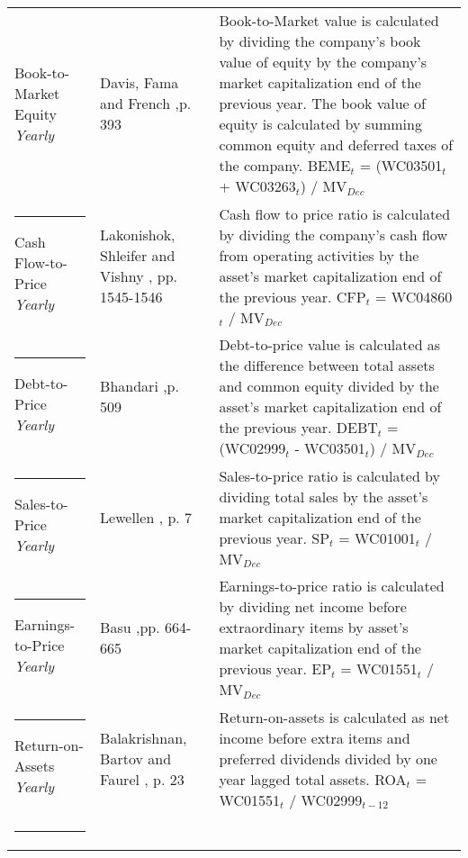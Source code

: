 \documentclass[12pt]{article}
\begin{document}
\begin{appendices}
{{\begin{xltabular}{\textwidth}{ >{\raggedright\arraybackslash}p{0.23\textwidth} >{\raggedright\arraybackslash}p{0.2\textwidth} X}
Book-to-Market Equity \newline \emph{Yearly} 	& Davis, Fama and French \citeyearpar{Davis2000},\newline p. 393	&  Book-to-Market value is calculated by dividing the company's book value of equity by the company's market capitalization end of the previous year. The book value of equity is calculated by summing common equity and deferred taxes of the company. \newline BEME$_t$ = (WC03501$_{t}$ + WC03263$_{t}$) /  MV$_{Dec}$\\ \rule{-1ex}{3ex}
Cash Flow-to-Price \newline \emph{Yearly}	& Lakonishok, Shleifer and Vishny  \citeyearpar{Lakonishok1994}, \newline pp. 1545-1546 & Cash flow to price ratio is calculated by dividing the company's cash flow from operating activities by the asset's market capitalization end of the previous year. \newline CFP$_t$ = WC04860$_{t}$ / MV$_{Dec}$\\ \rule{-1ex}{3ex}
Debt-to-Price \newline \emph{Yearly}			& Bhandari \citeyearpar{Bhandari1988},\newline p. 509				& Debt-to-price value is calculated as the difference between total assets and common equity divided by the asset's market capitalization end of the previous year. \newline DEBT$_t$ = (WC02999$_{t}$ - WC03501$_{t}$) / MV$_{Dec}$\\ \rule{-1ex}{3ex}
Sales-to-Price 	\newline \emph{Yearly}		& Lewellen \citeyearpar{Lewellen2015}, \newline p. 7				& Sales-to-price ratio is calculated by dividing total sales by the asset's market capitalization end of the previous year. \newline SP$_t$ = WC01001$_{t}$ / MV$_{Dec}$ \\ \rule{-1ex}{3ex}
Earnings-to-Price \newline \emph{Yearly}		& Basu \citeyearpar{Basu1977},\newline pp. 664-665				& Earnings-to-price ratio is calculated by dividing net income before extraordinary items by asset's market capitalization end of the previous year. \newline EP$_t$ = WC01551$_{t}$ / MV$_{Dec}$ \\ \rule{-1ex}{3ex}
Return-on-Assets \newline \emph{Yearly}		& Balakrishnan, Bartov and Faurel \citeyearpar{BALAKRISHNAN2010}, p. 23	& Return-on-assets is calculated as net income before extra items and preferred dividends divided by one year lagged total assets. \newline ROA$_t$ = WC01551$_{t}$ / WC02999$_{t-12}$ \\ \rule{-1ex}{3ex}

\end{xltabular}}}
\end{appendices}
\end{document}
